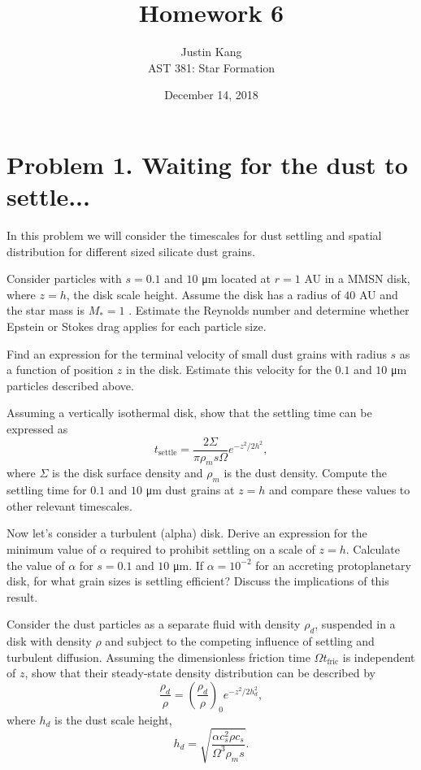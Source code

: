 \documentclass[11pt]{article}
\title{\vspace{-2.5em} \textbf{Homework 6}}
\author{Justin Kang \\ AST 381: Star Formation}
\date{\vspace{-0.75em} December 14, 2018}
\newenvironment{tight_enumerate}{
    \begin{enumerate}[label=(\alph*)]
    \setlength{\itemsep}{3pt}
    \setlength{\parskip}{0pt}}
    {\end{enumerate}}
\begin{document}
\maketitle
\singlespacing
{}
\sloppy


\vspace{-2.5em}
\section*{Problem 1. Waiting for the dust to settle...}
In this problem we will consider the timescales for dust settling and spatial distribution for different sized silicate dust grains.
\begin{tight_enumerate}
\item Consider particles with $s = 0.1$ and $10$ \si{\micro\meter} located at $r = 1$ \si{AU} in a MMSN disk, where $z = h$, the disk scale height. Assume the disk has a radius of $40$ \si{AU} and the star mass is $M_{*} = 1$ \si{\msun}. Estimate the Reynolds number and determine whether Epstein or Stokes drag applies for each particle size.

\item Find an expression for the terminal velocity of small dust grains with radius $s$ as a function of position $z$ in the disk. Estimate this velocity for the $0.1$ and $10$ \si{\micro\meter} particles described above.

\item Assuming a vertically isothermal disk, show that the settling time can be expressed as 
\[t_\text{settle} = \frac{2\Sigma}{\pi\rho_{m}s\Omega}e^{-z^{2}/2h^{2}},\]
where $\Sigma$ is the disk surface density and $\rho_m$ is the dust density. Compute the settling time for $0.1$ and $10$ \si{\micro\meter} dust grains at $z = h$ and compare these values to other relevant timescales.

\item Now let's consider a turbulent (alpha) disk. Derive an expression for the minimum value of $\alpha$ required to prohibit settling on a scale of $z = h$. Calculate the value of $\alpha$ for $s = 0.1$ and $10$ \si{\micro\meter}. If $\alpha = 10^{-2}$ for an accreting protoplanetary disk, for what grain sizes is settling efficient? Discuss the implications of this result.

\item Consider the dust particles as a separate fluid with density $\rho_{d}$, suspended in a disk with density $\rho$ and subject to the competing influence of settling and turbulent diffusion. Assuming the dimensionless friction time $\Omega{t_\text{fric}}$ is independent of $z$, show that their steady-state density distribution can be described by 
\[\frac{\rho_d}{\rho} = \left(\frac{\rho_d}{\rho}\right)_{0}e^{-z^{2}/2h_d^2},\]
where $h_d$ is the dust scale height, 
\[h_d = \sqrt{\frac{\alpha{c_s^2}\rho{c_s}}{\Omega^{3}\rho_{m}s}}.\]
\end{tight_enumerate}
\end{document}
